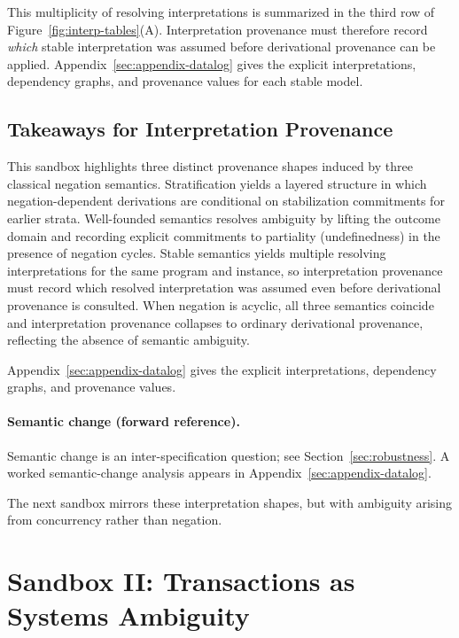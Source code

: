 \documentclass[acmsmall,nonacm]{acmart}
\theoremstyle{remark}
\numberwithin{definition}{section}
\numberwithin{theorem}{section}
\numberwithin{lemma}{section}
\numberwithin{corollary}{section}
\numberwithin{remark}{section}
\numberwithin{example}{section}
\numberwithin{observation}{section}
\numberwithin{assumption}{section}
\begin{document}
This multiplicity of resolving interpretations is summarized in the third row of
Figure~\ref{fig:interp-tables}(A).
Interpretation provenance must therefore record \emph{which} stable interpretation
was assumed before derivational provenance can be applied.
Appendix~\ref{sec:appendix-datalog} gives the explicit interpretations, dependency
graphs, and provenance values for each stable model.

\subsection{Takeaways for Interpretation Provenance}

This sandbox highlights three distinct provenance shapes induced by three
classical negation semantics.
Stratification yields a layered structure in which negation-dependent derivations
are conditional on stabilization commitments for earlier strata.
Well-founded semantics resolves ambiguity by lifting the outcome domain and
recording explicit commitments to partiality (undefinedness) in the presence of
negation cycles.
Stable semantics yields multiple resolving interpretations for the same program
and instance, so interpretation provenance must record which resolved
interpretation was assumed even before derivational provenance is consulted.
When negation is acyclic, all three semantics coincide and interpretation
provenance collapses to ordinary derivational provenance, reflecting the absence
of semantic ambiguity.

Appendix~\ref{sec:appendix-datalog} gives the explicit interpretations, dependency graphs, and provenance values.

\paragraph{Semantic change (forward reference).}
Semantic change is an inter-specification question; see Section~\ref{sec:robustness}.
A worked semantic-change analysis appears in Appendix~\ref{sec:appendix-datalog}.

The next sandbox mirrors these interpretation shapes, but with ambiguity arising
from concurrency rather than negation.

\section{Sandbox II: Transactions as Systems Ambiguity}
\label{sec:transactions}
\end{document}
